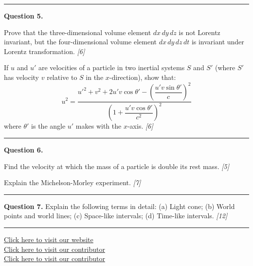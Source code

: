 \documentclass[11pt,a4paper]{article}
\newcommand{\pts}[1]{\hfill   \textit{[#1]}}
\begin{document}
\medskip\rule{\linewidth}{0.2pt}

\medskip


\noindent   \textbf{Question 5.}

\begin{parts}
  \item Prove that the three-dimensional volume element $dx\,dy\,dz$ is not Lorentz invariant, but the four-dimensional volume element $dx\,dy\,dz\,dt$ is invariant under Lorentz transformation. \pts{6}
  \item If $u$ and $u'$ are velocities of a particle in two inertial systems $S$ and $S'$ (where $S'$ has velocity $v$ relative to $S$ in the $x$-direction), show that:
  \[
  u^2 = \frac{u'^2 + v^2 + 2u'v\cos \theta'- \left(\dfrac{u'v\sin \theta'}{c}\right)^2}{\left(1 + \dfrac{u'v\cos \theta'}{c^2}\right)^2}
  \]
  where $ \theta'$ is the angle $u'$ makes with the $x$-axis. \pts{6}
\end{parts}

\medskip\rule{\linewidth}{0.2pt}

\medskip


\noindent   \textbf{Question 6.}

\begin{parts}
  \item Find the velocity at which the mass of a particle is double its rest mass. \pts{5}
  \item Explain the Michelson-Morley experiment. \pts{7}
\end{parts}

\medskip\rule{\linewidth}{0.2pt}

\medskip


\noindent   \textbf{Question 7.}
Explain the following terms in detail: (a) Light cone; (b) World points and world lines; (c) Space-like intervals; (d) Time-like intervals. \pts{12}

\vfill\rule{\linewidth}{0.4pt}

\begin{center}\small
  \href{https://bhu-exam.vercel.app/}{Click here to visit our website}\\[4pt]
  \href{https://me-aryan.vercel.app/}{Click here to visit our contributor}\\[4pt]
  \href{https://quashan-me.vercel.app/}{Click here to visit our contributor}
\end{center}
\end{document}
